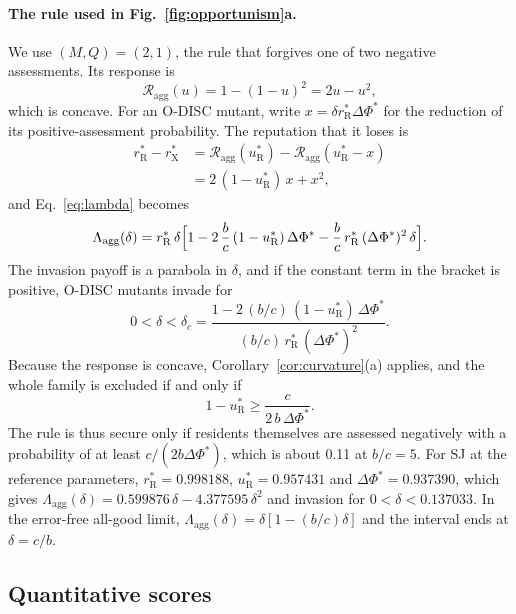 \documentclass[10pt]{wlscirep}
\newcommand{\Rmap}{\mathscr{R}}            %
\newcommand{\rR}{r_{\mathrm{R}}^{*}}
\newcommand{\uR}{u_{\mathrm{R}}^{*}}
\newcommand{\rX}{r_{\mathrm{X}}^{*}}
\newcommand{\dPhi}{\Delta\Phi^{*}}
\theoremstyle{plain}
\theoremstyle{remark}
\begin{document}
\paragraph{The rule used in Fig.~\ref{fig:opportunism}a.} We use $(M,Q)=(2,1)$, the rule that forgives one of two negative assessments. Its response is
\begin{equation}
\Rmap_{\mathrm{agg}}(u)=1-(1-u)^2=2u-u^2,
\label{eq:s-agg-21}
\end{equation}
which is concave. For an O-DISC mutant, write $x=\delta\rR\dPhi$ for the reduction of its positive-assessment probability. The reputation that it loses is
\begin{equation}
\begin{aligned}
\rR-\rX&=\Rmap_{\mathrm{agg}}(\uR)-\Rmap_{\mathrm{agg}}(\uR-x)\\
&=2\,(1-\uR)\,x+x^2,
\end{aligned}
\label{eq:s-agg-loss}
\end{equation}
and Eq.~\eqref{eq:lambda} becomes
\begin{equation}
\Lambda_{\mathrm{agg}}(\delta)=\rR\,\delta\Bigl[1-2\,\frac{b}{c}\,(1-\uR)\,\dPhi-\frac{b}{c}\,\rR\,(\dPhi)^2\,\delta\Bigr].
\label{eq:s-aggregation-lambda}
\end{equation}
The invasion payoff is a parabola in $\delta$, and if the constant term in the bracket is positive, O-DISC mutants invade for
\begin{equation}
0<\delta<\delta_c=\frac{1-2\,(b/c)\,(1-\uR)\,\dPhi}{(b/c)\,\rR\,(\dPhi)^2}.
\label{eq:s-agg-window}
\end{equation}
Because the response is concave, Corollary~\ref{cor:curvature}(a) applies, and the whole family is excluded if and only if
\begin{equation}
1-\uR\geq\frac{c}{2\,b\,\dPhi}.
\label{eq:s-agg-secure}
\end{equation}
The rule is thus secure only if residents themselves are assessed negatively with a probability of at least $c/(2b\dPhi)$, which is about 0.11 at $b/c=5$. For SJ at the reference parameters, $\rR=0.998188$, $\uR=0.957431$ and $\dPhi=0.937390$, which gives $\Lambda_{\mathrm{agg}}(\delta)=0.599876\,\delta-4.377595\,\delta^2$ and invasion for $0<\delta<0.137033$. In the error-free all-good limit, $\Lambda_{\mathrm{agg}}(\delta)=\delta[1-(b/c)\delta]$ and the interval ends at $\delta=c/b$.

\subsection{Quantitative scores}
\end{document}
